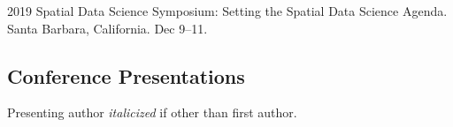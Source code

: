 \documentclass[12pt,letterpaper]{report}
\begin{document}
    \begin{tablist}

        \item[2019] \tab Spatial Data Science Symposium: Setting the Spatial Data Science Agenda. Santa Barbara, California. Dec 9--11.

    \end{tablist}

    \subsection*{Conference Presentations}

    Presenting author \textit{italicized} if other than first author.\bigskip
\end{document}
